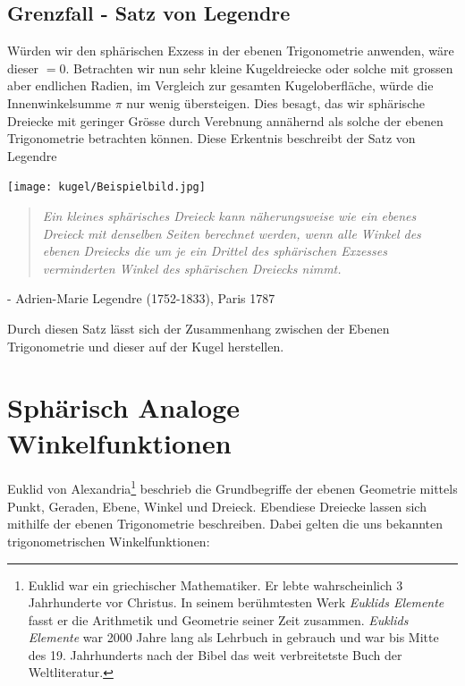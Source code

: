 \begin{refsection}
\subsection{Grenzfall - Satz von Legendre}
Würden wir den sphärischen Exzess in der ebenen Trigonometrie anwenden, wäre dieser $=0$. Betrachten wir nun sehr kleine Kugeldreiecke oder solche mit grossen aber endlichen Radien, im Vergleich zur gesamten Kugeloberfläche, würde die Innenwinkelsumme $\pi$ nur wenig übersteigen. Dies besagt, das wir sphärische Dreiecke mit geringer Grösse durch Verebnung annähernd als solche der ebenen Trigonometrie betrachten können. Diese Erkentnis beschreibt der Satz von Legendre

\begin{center}
        \texttt{[image: kugel/Beispielbild.jpg]}
\end{center}

\begin{quote} \textit{Ein kleines sphärisches Dreieck kann näherungsweise 
wie ein ebenes Dreieck mit denselben Seiten berechnet 
werden, wenn alle Winkel des ebenen Dreiecks die um 
je ein Drittel des sphärischen Exzesses verminderten 
Winkel des sphärischen Dreiecks nimmt.} \end{quote}
\begin{flushright} - Adrien-Marie Legendre (1752-1833), Paris 1787
\end{flushright}

Durch diesen Satz lässt sich der Zusammenhang zwischen der Ebenen Trigonometrie und dieser auf der Kugel herstellen.



\section{Sphärisch Analoge Winkelfunktionen}
Euklid von Alexandria\footnote{%
Euklid war ein griechischer Mathematiker. Er lebte wahrscheinlich 3 Jahrhunderte vor Christus. In seinem berühmtesten Werk \textit{Euklids Elemente} fasst er die Arithmetik und Geometrie seiner Zeit zusammen. \textit{Euklids Elemente} war 2000 Jahre lang als Lehrbuch in gebrauch und war bis Mitte des 19. Jahrhunderts nach der Bibel das weit verbreitetste Buch der Weltliteratur.}  beschrieb die Grundbegriffe der ebenen Geometrie mittels Punkt, Geraden, Ebene, Winkel und Dreieck. Ebendiese Dreiecke lassen sich mithilfe der ebenen Trigonometrie beschreiben. Dabei gelten die uns bekannten trigonometrischen Winkelfunktionen:


\end{refsection}
